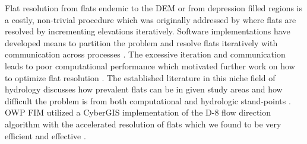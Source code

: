 \documentclass[draft]{dependencies/agujournal2019}
\begin{document}
Flat resolution from flats endemic to the DEM or from depression filled regions is a costly, non-trivial procedure which was originally addressed by  where flats are resolved by incrementing elevations iteratively.
Software implementations have developed means to partition the problem and resolve flats iteratively with communication across processes \cite{tarboton2009generalized,tesfa2011extraction,wallis2009parallel,tarboton2005terrain}.
The excessive iteration and communication leads to poor computational performance which motivated further work on how to optimize flat resolution \cite{survila2016scalable,barnes2014efficient}.
The established literature in this niche field of hydrology discusses how prevalent flats can be in given study areas and how difficult the problem is from both computational and hydrologic stand-points \cite{garbrecht1997assignment,tarboton2009generalized,tarboton2005terrain,survila2016scalable,barnes2014efficient,tesfa2011extraction,wallis2009parallel}.
OWP FIM utilized a CyberGIS implementation of the D-8 flow direction algorithm with the accelerated resolution of flats which we found to be very efficient and effective \cite{survila2016scalable,cybergis2016}. 
%
%

%

%
\end{document}
